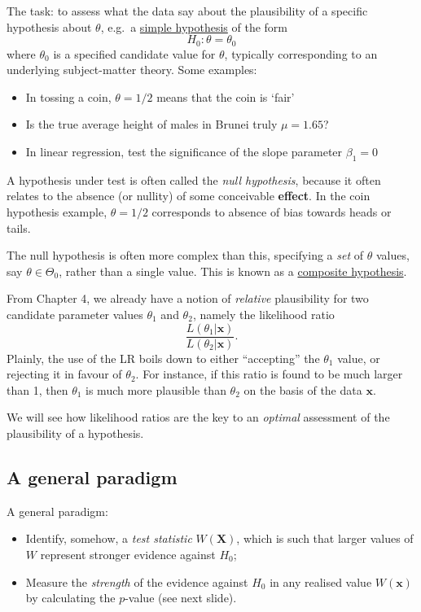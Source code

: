 \documentclass[
]{book}
\providecommand{\tightlist}{%
  \setlength{\itemsep}{0pt}\setlength{\parskip}{0pt}}
\newcommand{\bx}{{\boldsymbol x}}
\newcommand{\bX}{{\boldsymbol X}}
\theoremstyle{definition}
\theoremstyle{definition}
\theoremstyle{definition}
\theoremstyle{definition}
\theoremstyle{remark}
\begin{document}
The task: to assess what the data say about the plausibility of a specific hypothesis about \(\theta\), e.g.~a \uline{simple hypothesis} of the form
\[
H_0: \theta = \theta_0
\]
where \(\theta_0\) is a specified candidate value for \(\theta\), typically corresponding to an underlying subject-matter theory.
Some examples:

\begin{itemize}
\tightlist
\item
  In tossing a coin, \(\theta = 1/2\) means that the coin is `fair'
\item
  Is the true average height of males in Brunei truly \(\mu=1.65\)?
\item
  In linear regression, test the significance of the slope parameter \(\beta_1=0\)
\end{itemize}

A hypothesis under test is often called the \emph{null hypothesis}, because it often relates to the absence (or nullity) of some conceivable \textbf{effect}. In the coin hypothesis example, \(\theta=1/2\) corresponds to absence of bias towards heads or tails.

The null hypothesis is often more complex than this, specifying a \emph{set} of \(\theta\) values, say \(\theta\in\Theta_0\), rather than a single value. This is known as a \uline{composite hypothesis}.

From Chapter 4, we already have a notion of \emph{relative} plausibility for two candidate parameter values \(\theta_1\) and \(\theta_2\), namely the likelihood ratio
\[
\frac{L(\theta_1|\bx)}{L(\theta_2|\bx)}.
\]
Plainly, the use of the LR boils down to either ``accepting'' the \(\theta_1\) value, or rejecting it in favour of \(\theta_2\).
For instance, if this ratio is found to be much larger than 1, then \(\theta_1\) is much more plausible than \(\theta_2\) on the basis of the data \(\bx\).

We will see how likelihood ratios are the key to an \emph{optimal} assessment of the plausibility of a hypothesis.

\hypertarget{a-general-paradigm}{%
\subsection{A general paradigm}\label{a-general-paradigm}}

A general paradigm:

\begin{itemize}
\item
  Identify, somehow, a \emph{test statistic} \(W(\bX)\), which is such that larger values of \(W\) represent stronger evidence against \(H_0\);
\item
  Measure the \emph{strength} of the evidence against \(H_0\) in any realised value \(W(\bx)\) by calculating the \(p\)-value (see next slide).
\end{itemize}
\end{document}
